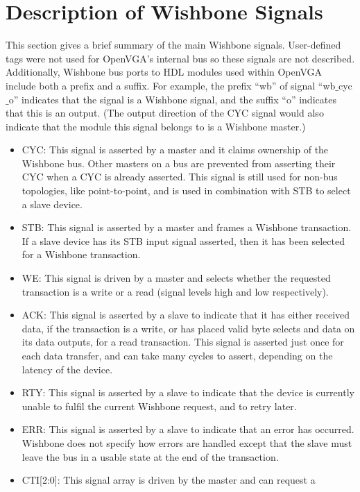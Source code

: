 \section{Description of Wishbone Signals}
This section gives a brief summary of the main Wishbone signals. User-defined
tags were not used for OpenVGA's internal bus so these signals are not described.
Additionally, Wishbone bus ports to HDL modules used within OpenVGA include both
a prefix and a suffix. For example, the prefix ``wb'' of signal
``wb$\_$cyc$\_$o'' indicates that the signal is a Wishbone signal, and the
suffix ``o'' indicates that this is an output. (The output direction of the CYC signal would also
indicate that the module this signal belongs to is a Wishbone master.)

\begin{itemize}
  \item CYC: This signal is asserted by a master and it claims ownership of the
  Wishbone bus. Other masters on a bus are prevented from asserting their CYC
  when a CYC is already asserted. This signal is still used for non-bus
  topologies, like point-to-point, and is used in combination with STB to select a slave
  device.
  \item STB: This signal is asserted by a master and frames a Wishbone
  transaction. If a slave device has its STB input signal asserted, then it has
  been selected for a Wishbone transaction.
  \item WE: This signal is driven by a master and selects whether the
  requested transaction is a write or a read (signal levels high and low
  respectively).
  \item ACK: This signal is asserted by a slave to indicate that it has either
  received data, if the transaction is a write, or has placed valid byte
  selects and data on its data outputs, for a read transaction. This signal is
  asserted just once for each data transfer, and can take many cycles to assert, depending on the
  latency of the device.
  \item RTY: This signal is asserted by a slave to indicate that the device is
  currently unable to fulfil the current Wishbone request, and to retry
  later.
  \item ERR: This signal is asserted by a slave to indicate that an error has
  occurred. Wishbone does not specify how errors are handled except that the
  slave must leave the bus in a usable state at the end of the transaction.
  \item CTI[2:0]: This signal array is driven by the master and can request a

\end{itemize}

